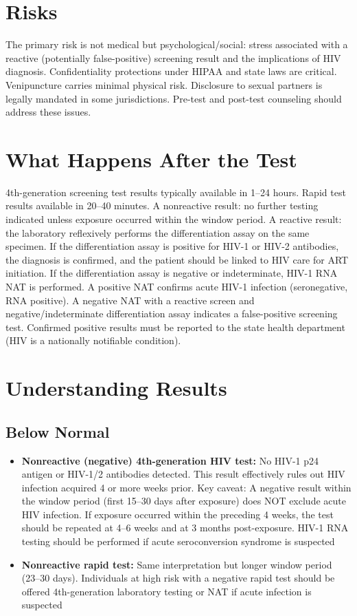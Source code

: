 \section*{Risks}
The primary risk is not medical but psychological/social: stress associated with a reactive (potentially false-positive) screening result and the implications of HIV diagnosis. Confidentiality protections under HIPAA and state laws are critical. Venipuncture carries minimal physical risk. Disclosure to sexual partners is legally mandated in some jurisdictions. Pre-test and post-test counseling should address these issues.

\section*{What Happens After the Test}
4th-generation screening test results typically available in 1--24 hours. Rapid test results available in 20--40 minutes. A nonreactive result: no further testing indicated unless exposure occurred within the window period. A reactive result: the laboratory reflexively performs the differentiation assay on the same specimen. If the differentiation assay is positive for HIV-1 or HIV-2 antibodies, the diagnosis is confirmed, and the patient should be linked to HIV care for ART initiation. If the differentiation assay is negative or indeterminate, HIV-1 RNA NAT is performed. A positive NAT confirms acute HIV-1 infection (seronegative, RNA positive). A negative NAT with a reactive screen and negative/indeterminate differentiation assay indicates a false-positive screening test. Confirmed positive results must be reported to the state health department (HIV is a nationally notifiable condition).

\section*{Understanding Results}

\subsection*{Below Normal}
\begin{itemize}
  \item \textbf{Nonreactive (negative) 4th-generation HIV test:} No HIV-1 p24 antigen or HIV-1/2 antibodies detected. This result effectively rules out HIV infection acquired 4 or more weeks prior. Key caveat: A negative result within the window period (first 15--30 days after exposure) does NOT exclude acute HIV infection. If exposure occurred within the preceding 4 weeks, the test should be repeated at 4--6 weeks and at 3 months post-exposure. HIV-1 RNA testing should be performed if acute seroconversion syndrome is suspected
  \item \textbf{Nonreactive rapid test:} Same interpretation but longer window period (23--30 days). Individuals at high risk with a negative rapid test should be offered 4th-generation laboratory testing or NAT if acute infection is suspected
\end{itemize}

